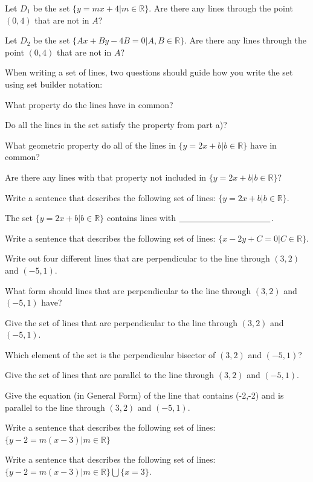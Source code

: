 \bq
\be
\item Let $D_1$ be the set $\{ y=mx+4| m \in \mathbb{R}\}$. Are there any lines through the point $(0,4)$ that are not in $A$?
\item Let $D_2$ be the set $\{ Ax+By-4B=0 | A,B \in \mathbb{R}\}$. Are there any lines through the point $(0,4)$ that are not in $A$?
\ee
\eq

When writing a set of lines, two questions should guide how you write the set using set builder notation:
\be
\item What property do the lines have in common?
\item Do all the lines in the set satisfy the property from part a)?
\ee

\bq \be
\item What geometric property do all of the lines in $\{ y=2x+b| b \in \mathbb{R}\}$ have in common?
\item Are there any lines with that property not included in $\{ y=2x+b| b \in \mathbb{R}\}$?
\item Write a sentence that describes the following set of lines: $\{ y=2x+b| b \in \mathbb{R}\}$.

The set $\{ y=2x+b| b \in \mathbb{R}\}$ contains lines with $\underline{\hspace{1.5in}}$.
\ee
\eq

\bq Write a sentence that describes the following set of lines: $\{ x-2y+C=0| C \in \mathbb{R}\}$.
\eq

\bq
\be
\item Write out four different lines that are perpendicular to the line through $(3,2)$ and $(-5,1)$.
\item What form should lines that are perpendicular to the line through $(3,2)$ and $(-5,1)$ have?
\item Give the set of lines that are perpendicular to the line through $(3,2)$ and $(-5,1)$.
\item Which element of the set is the perpendicular bisector of $(3,2)$ and $(-5,1)$?
\ee
\eq


\bq Give the set of lines that are parallel to the line through $(3,2)$ and $(-5,1)$.
\eq

\bq Give the equation (in General Form) of the line that contains (-2,-2) and is parallel to the line through $(3,2)$ and $(-5,1)$.
\eq

\bq Write a sentence that describes the following set of lines: $\{ y-2=m(x-3)| m \in \mathbb{R}\}$
\eq

\bq Write a sentence that describes the following set of lines: $\{ y-2=m(x-3)| m \in \mathbb{R}\} \bigcup \{x=3\}$.
\eq

